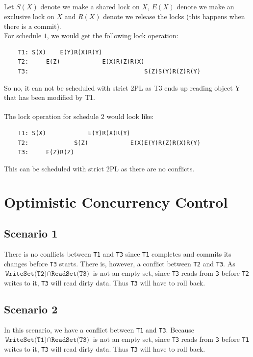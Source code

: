 \documentclass[a4paper]{article}
\begin{document}
\subsection{}
Let $S(X)$ denote we make a shared lock on $X$, $E(X)$ denote we make an exclusive lock on $X$ and $R(X)$ denote we release the locks (this happens when there is a commit). \\
For schedule $1$, we would get the following lock operation:
\begin{verbatim}
    T1: S(X)    E(Y)R(X)R(Y)
    T2:     E(Z)            E(X)R(Z)R(X)
    T3:                                 S(Z)S(Y)R(Z)R(Y)
\end{verbatim}
So no, it can not be scheduled with strict 2PL as T3 ends up reading object Y that has been modified by T1. \\
\\
The lock operation for schedule $2$ would look like:
\begin{verbatim}
    T1: S(X)            E(Y)R(X)R(Y)
    T2:             S(Z)            E(X)E(Y)R(Z)R(X)R(Y)
    T3:     E(Z)R(Z)
\end{verbatim}
This can be scheduled with strict 2PL as there are no conflicts.

\section{Optimistic Concurrency Control}

\subsection{Scenario 1}
There is no conflicts between \texttt{T1} and \texttt{T3} since \texttt{T1} completes and commits its changes before \texttt{T3} starts. There is, however, a conflict between \texttt{T2} and \texttt{T3}. As $\texttt{WriteSet(T2)} \cap \texttt{ReadSet(T3)}$ is not an empty set, since \texttt{T3} reads from \texttt{3} before \texttt{T2} writes to it, \texttt{T3} will read dirty data. Thus \texttt{T3} will have to roll back.
\subsection{Scenario 2}
In this scenario, we have a conflict between \texttt{T1} and \texttt{T3}. Because $\texttt{WriteSet(T1)} \cap \texttt{ReadSet(T3)}$ is not an empty set, since \texttt{T3} reads from \texttt{3} before \texttt{T1} writes to it, \texttt{T3} will read dirty data. Thus \texttt{T3} will have to roll back.
\end{document}
